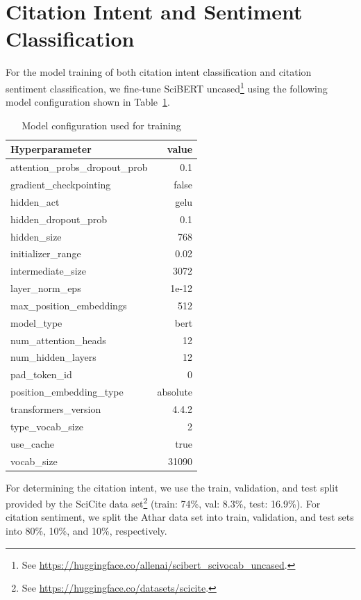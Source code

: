 \section{Citation Intent and Sentiment Classification}
\label{app:classifcation}

For the model training of both citation intent classification and citation sentiment classification, we fine-tune SciBERT uncased\footnote{See \url{https://huggingface.co/allenai/scibert_scivocab_uncased}.} using the following model configuration shown in Table~\ref{tab:modelconf}.

\begin{table}
\caption{Model configuration used for training}
 \label{tab:modelconf}
  \centering
  \begin{small}
 \begin{threeparttable}
 \begin{tabular}{lr}
 \toprule
   Hyperparameter & value \\
   \midrule
  attention\_probs\_dropout\_prob &  0.1 \\
  gradient\_checkpointing &  false \\
  hidden\_act &  gelu \\
  hidden\_dropout\_prob &  0.1 \\
  hidden\_size &  768 \\
  initializer\_range &  0.02 \\
  intermediate\_size &  3072 \\
  layer\_norm\_eps &  1e-12 \\
  max\_position\_embeddings &  512 \\
  model\_type &  bert \\
  num\_attention\_heads &  12 \\
  num\_hidden\_layers &  12 \\
  pad\_token\_id &  0 \\
  position\_embedding\_type &  absolute \\
  transformers\_version &  4.4.2 \\
  type\_vocab\_size &  2 \\
  use\_cache &  true \\
  vocab\_size &  31090 \\
   \bottomrule
 \end{tabular}
\end{threeparttable}
  \end{small}
\end{table}

For determining the citation intent, we use the train, validation, and test split provided by the SciCite data set\footnote{See \url{https://huggingface.co/datasets/scicite}.} (train: 74\%, val: 8.3\%, test: 16.9\%). For citation sentiment, we split the Athar data set into train, validation, and test sets into 80\%, 10\%, and 10\%, respectively.




